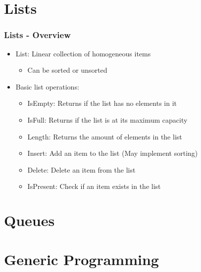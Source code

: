 \documentclass[c, aspectratio=169]{beamer}
\begin{document}
\section{Lists}
\begin{frame}\frametitle{Lists - Overview}
\begin{itemize}
\item List: Linear collection of homogeneous items
	\begin{itemize}
	\item Can be sorted or unsorted
	\end{itemize}
\item Basic list operations:
	\begin{itemize}
	\item IsEmpty: Returns if the list has no elements in it
	\item IsFull: Returns if the list is at its maximum capacity
	\item Length: Returns the amount of elements in the list
	\item Insert: Add an item to the list (May implement sorting)
	\item Delete: Delete an item from the list
	\item IsPresent: Check if an item exists in the list
	\end{itemize}
\end{itemize}
\end{frame}

\begin{frame}\end{frame}
\begin{frame}\end{frame}

\section{Queues}
\begin{frame}\end{frame}
\begin{frame}\end{frame}
\begin{frame}\end{frame}

\section{Generic Programming}
\begin{frame}\end{frame}
\begin{frame}\end{frame}
\begin{frame}\end{frame}
\end{document}
